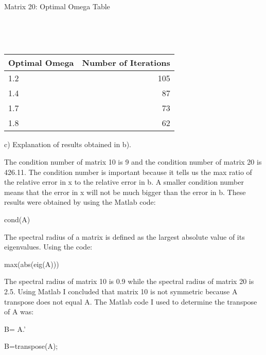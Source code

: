 \documentclass[letterpaper,12pt]{article}
\begin{document}
\begin{enumerate}
\begin{enumerate}
\begin{center}
\begin{tabular}{|l|r|}
\end{tabular}
\end{center}





\begin{center}
\\Matrix 20: Optimal Omega Table

\end{center}
\\

\begin{center}
\\\begin{tabular}{|l|r|}
\hline
\textbf{Optimal Omega}  & \textbf{Number of Iterations}\\ \hline
1.2 & 105\\ \hline
1.4 & 87  \\ \hline
1.7 & 73  \\\hline
1.8 & 62 \\ \hline

\end{tabular}
\end{center}










c)  Explanation of results obtained in b).

The condition number of matrix 10 is 9 and the condition number of matrix 20 is 426.11. The condition number is important because it tells us the max ratio of the relative error in x to the relative error in b. A smaller condition number means that the error in x will not be much bigger than the error in b. These results were obtained by using the Matlab code:

cond(A)

The spectral radius of a matrix is defined as the largest absolute value of its eigenvalues. Using the code:

max(abs(eig(A))) 

The spectral radius of matrix 10 is 0.9 while the spectral radius of matrix 20 is 2.5. Using Matlab I concluded that matrix 10 is not symmetric because A transpose does not equal A. The Matlab code I used to determine the transpose of A was:

B= A.'

B=transpose(A); 


\end{enumerate}
\end{enumerate}
\end{document}
